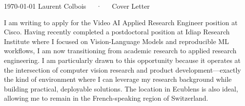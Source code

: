 \documentclass[11pt, a4paper]{awesome-cv}
\begin{document}
\makecvheader[R]

\makecvfooter
  {\today}
  {Laurent Colbois~~~·~~~Cover Letter}
  {}

\makelettertitle

\begin{cvletter}

I am writing to apply for the Video AI Applied Research Engineer position at Cisco. Having recently completed a postdoctoral position at Idiap Research Institute where I focused on Vision-Language Models and reproducible ML workflows, I am now transitioning from academic research to applied research engineering. I am particularly drawn to this opportunity because it operates at the intersection of computer vision research and product development—exactly the kind of environment where I can leverage my research background while building practical, deployable solutions. The location in Ecublens is also ideal, allowing me to remain in the French-speaking region of Switzerland.



%
%


\end{cvletter}
\end{document}
